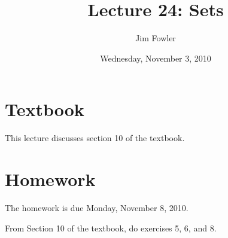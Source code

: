 \documentclass[12pt]{handout}
\title{Lecture 24: Sets}
\author{Jim Fowler}
\date{Wednesday, November  3, 2010}
\begin{document}
\maketitle

\section*{Textbook}

This lecture discusses section 10 of the textbook.


\section*{Homework} 





The homework is due Monday, November  8, 2010.






From Section 10 of the textbook, do exercises 5, 6, and 8.
\end{document}
